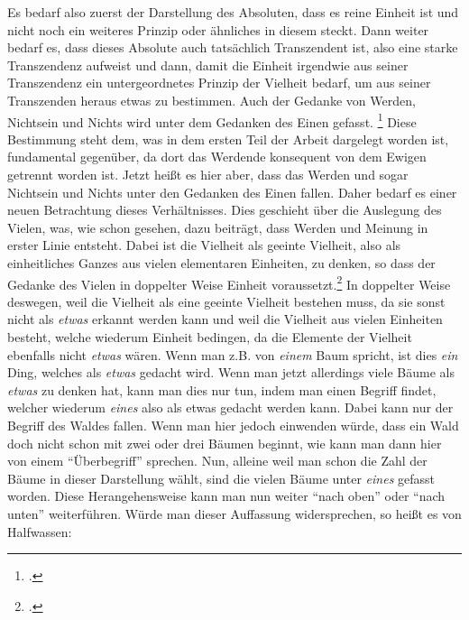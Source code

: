 Es bedarf also zuerst der Darstellung des Absoluten, dass es reine Einheit ist und nicht noch ein weiteres Prinzip oder ähnliches in diesem steckt. Dann weiter bedarf es, dass dieses Absolute auch tatsächlich Transzendent ist, also eine starke Transzendenz aufweist und dann, damit die Einheit irgendwie aus seiner Transzendenz ein untergeordnetes Prinzip der Vielheit bedarf, um aus seiner Transzenden heraus etwas zu bestimmen.
Auch der Gedanke von Werden, Nichtsein und Nichts wird unter dem Gedanken des Einen gefasst. \footcite[vgl.][S. 97]{halfwassen2015spuren} Diese Bestimmung steht dem, was in dem ersten Teil der Arbeit dargelegt worden ist, fundamental gegenüber, da dort das Werdende konsequent von dem Ewigen getrennt worden ist. Jetzt heißt es hier aber, dass das Werden und sogar Nichtsein und Nichts unter den Gedanken des Einen fallen. Daher bedarf es einer neuen Betrachtung dieses Verhältnisses. Dies geschieht über die Auslegung des Vielen, was, wie schon gesehen, dazu beiträgt, dass Werden und Meinung in erster Linie entsteht. Dabei ist die Vielheit als geeinte Vielheit, also als einheitliches Ganzes aus vielen elementaren Einheiten, zu denken, so dass der Gedanke des Vielen in doppelter Weise Einheit voraussetzt.\footcite[vgl.][S. 97]{halfwassen2015spuren}
In doppelter Weise deswegen, weil die Vielheit als eine geeinte Vielheit bestehen muss, da sie sonst nicht als \emph{etwas} erkannt werden kann und weil die Vielheit aus vielen Einheiten besteht, welche wiederum Einheit bedingen, da die Elemente der Vielheit ebenfalls nicht \emph{etwas} wären. Wenn man z.B. von \emph{einem} Baum spricht, ist dies \emph{ein} Ding, welches als \emph{etwas} gedacht wird. Wenn man jetzt allerdings viele Bäume als \emph{etwas} zu denken hat, kann man dies nur tun, indem man einen Begriff findet, welcher wiederum \emph{eines} also als etwas gedacht werden kann. Dabei kann nur der Begriff des Waldes fallen. Wenn man hier jedoch einwenden würde, dass ein Wald doch nicht schon mit zwei oder drei Bäumen beginnt, wie kann man dann hier von einem \enquote{Überbegriff} sprechen. Nun, alleine weil man schon die Zahl der Bäume in dieser Darstellung wählt, sind die vielen Bäume unter \emph{eines} gefasst worden. Diese Herangehensweise kann man nun weiter \enquote{nach oben} oder \enquote{nach unten} weiterführen. Würde man dieser Auffassung widersprechen, so heißt es von Halfwassen:

